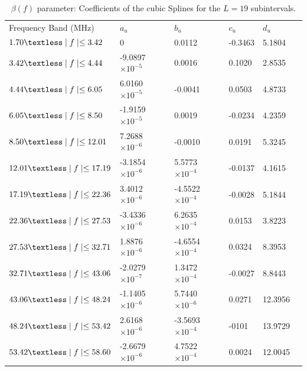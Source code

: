 \documentclass[journal]{IEEEtran}
\begin{document}
\begin{table}[h!]
	\setlength\extrarowheight{4.5pt}
	\centering
	\caption{$\beta(f)$ parameter: Coefficients of the cubic Splines for the $L=19$ subintervals.}
	\label{table_beta}
	\begin{tabular}{|C{4cm}|C{3cm}|C{3cm}|C{3cm}|C{3cm}|m{0cm}}
		Frequency Band (MHz)           		   & $a_u$    			   & $b_u$      			  & $c_u$   		 		& $d_u$ &\\ 
		$1.70\textless \mid f\mid \leq 3.42$   & 0 						   & 0.0112 				  & -0.3463 				& 5.1804  &\\ 
		$3.42\textless \mid f\mid \leq 4.44$   & -9.0897 $\times 10^{-5}$  & 0.0016 				  & 0.1020  				& 2.8535  &\\ 
		$4.44\textless \mid f\mid \leq 6.05$   & 6.0160  $\times 10^{-5}$  & -0.0041 				  & 0.0503 					& 4.8733  &\\ 
		$6.05\textless \mid f\mid \leq 8.50$   & -1.9159 $\times 10^{-5}$  & 0.0019 				  & -0.0234 				& 4.2359  &\\ 
		$8.50\textless \mid f\mid \leq 12.01$  & 7.2688  $\times 10^{-6}$  & -0.0010 				  & 0.0191 					& 5.3245  &\\ 
		$12.01\textless \mid f\mid \leq 17.19$ & -3.1854 $\times 10^{-6}$  & 5.5773 $\times 10^{-4}$  & -0.0137 				& 4.1615  &\\ 
		$17.19\textless \mid f\mid \leq 22.36$ & 3.4012 $\times 10^{-6}$   & -4.5522 $\times 10^{-4}$ & -0.0028  				& 5.1844  &\\ 
		$22.36\textless \mid f\mid \leq 27.53$ & -3.4336 $\times 10^{-6}$  & 6.2635 $\times 10^{-4}$  & 0.0153 					& 3.8223  &\\ 
		$27.53\textless \mid f\mid \leq 32.71$ & 1.8876  $\times 10^{-6}$  & -4.6554 $\times 10^{-4}$ & 0.0324 					& 8.3953  &\\ 
		$32.71\textless \mid f\mid \leq 43.06$ & -2.0279 $\times 10^{-7}$  & 1.3472 $\times 10^{-4}$  & -0.0027 				& 8.8443  &\\ 
		$43.06\textless \mid f\mid \leq 48.24$ & -1.1405  $\times 10^{-6}$ & 5.7440 $\times 10^{-6}$  & 0.0271  				& 12.3956 &\\ 
		$48.24\textless \mid f\mid \leq 53.42$ & 2.6168  $\times 10^{-6}$  & -3.5693 $\times 10^{-4}$ & -0101 					& 13.9729 &\\ 
		$53.42\textless \mid f\mid \leq 58.60$ & -2.6679 $\times 10^{-6}$  & 4.7522 $\times 10^{-4}$  & 0.0024 					& 12.0045 &\\ 

\end{tabular}
\end{table}
\end{document}
